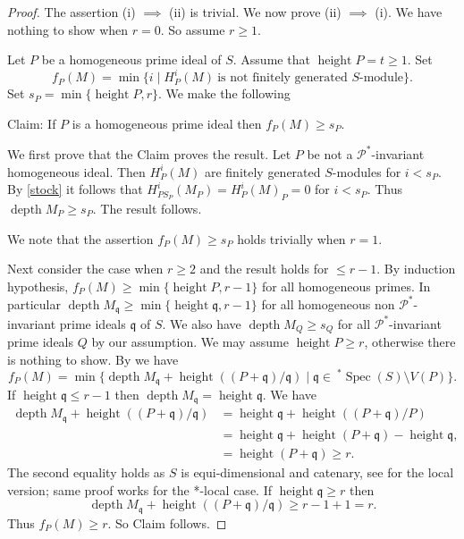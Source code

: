 \documentclass{amsart}
\newcommand{\q}{\mathfrak{q} }
\newcommand{\Pc}{\mathcal{P} }
\newcommand{\depth}{\operatorname{depth}}
\newcommand{\height}{\operatorname{height}}
\newcommand{\Spec}{\operatorname{Spec}}
\theoremstyle{plain}
\theoremstyle{definition}
\theoremstyle{remark}
\begin{document}
\begin{proof}
The assertion (i) $\implies$ (ii) is trivial.
We now prove (ii) $\implies$ (i). We have nothing to show when $r = 0$. So assume $r \geq 1$.

 Let $P$ be a homogeneous  prime ideal of $S$.
Assume that $\height P  = t \geq 1$. Set
$$f_P(M) = \min \{ i \mid H^i_P(M) \ \text{is not finitely generated $S$-module} \}. $$
Set $s_P = \min \{ \height P, r \}$.
We make the following

Claim: If $P$ is  a homogeneous prime ideal then $f_P(M)\geq  s_P$.

We first prove that the Claim proves the result. Let  $P$ be not a $\Pc^*$-invariant homogeneous  ideal. Then $H^i_P(M)$ are finitely generated $S$-modules for $i < s_P$.  By \ref{stock} it follows that $H^i_{PS_P}(M_P) = H^i_{P}(M)_P = 0$ for $i < s_P$. Thus $\depth M_P \geq s_P$. The result follows.

We note that the assertion $f_P(M) \geq s_P $ holds trivially when $r = 1$.

Next consider the case when $r \geq 2$ and the result holds for $\leq r - 1$.
By induction hypothesis, $f_P(M) \geq \min \{ \height P, r - 1 \}$ for all homogeneous primes.   In particular $\depth M_\q \geq  \min \{\height \q, r - 1 \}$ for all homogeneous non $\Pc^*$-invariant prime ideals $\q$ of $S$. We also have $\depth  M_Q \geq s_Q$ for all $\Pc^*$-invariant prime ideals $Q$ by our assumption.
We may assume $\height P \geq r$, otherwise there is nothing to show.
 By \cite[13.1.17]{bs} we have
\[
f_P(M) = \min \{ \depth M_\q  + \height((P+\q)/\q) \mid \q \in \  ^* \Spec(S) \setminus V(P) \}.
\]
If $\height \q \leq r -1$ then $\depth M_\q = \height \q$. We have
\begin{align*}
  \depth M_\q + \height((P+\q)/\q) &=  \height \q + \height((P + \q)/P) \\
  &= \height \q + \height(P + \q) - \height \q,  \\
  &= \height(P + \q)\geq  r.
\end{align*}
The second equality holds as $S$ is equi-dimensional and catenary, see  \cite[Lemma 2, p.\ 250]{Ma} for the local version; same proof works for the *-local case.
If $\height \q \geq r$ then $$\depth M_\q  + \height((P+\q)/\q)  \geq r - 1 + 1 = r. $$
Thus $f_P(M) \geq r$. So Claim follows.
\end{proof}
\end{document}
